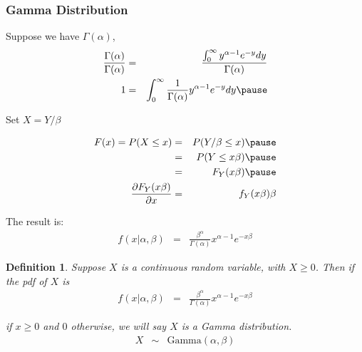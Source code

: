 \documentclass[handout]{beamer}
\newtheorem{defn}{Definition}
\numberwithin{equation}{section}
\begin{document}
\begin{frame}
\frametitle{Gamma Distribution}

Suppose we have $\Gamma(\alpha)$,  \pause 
\begin{eqnarray}
\frac{\Gamma(\alpha)}{\Gamma(\alpha)} & = & \frac{\int_{0}^{\infty} y^{\alpha-1} e^{-y} dy}{\Gamma(\alpha)} \nonumber \\
1 & = & \int_{0}^{\infty} \frac{1}{\Gamma(\alpha)} y^{\alpha-1} e^{-y} dy \nonumber  \pause 
\end{eqnarray}

Set $X = Y/\beta$ \pause 

\begin{eqnarray}
F(x) = P(X \leq x) & = & P(Y/\beta \leq x ) \nonumber \pause\\
& = & P(Y \leq x \beta ) \nonumber \pause\\
 & = & F_{Y} (x \beta) \nonumber \pause\\
\frac{\partial F_{Y} (x \beta) }{\partial x} & = & f_{Y} (x \beta) \beta \nonumber 
\end{eqnarray}

The result is: \pause 
 \begin{eqnarray}
f(x|\alpha, \beta) & = & \frac{\beta^{\alpha}}{\Gamma(\alpha)} x^{\alpha - 1} e^{-x\beta}  \nonumber 
 \end{eqnarray}



\end{frame}


\begin{frame}

\begin{defn}
Suppose $X$ is a continuous random variable, with $X \geq 0$.  Then if the pdf of $X$ is 
 \begin{eqnarray}
f(x|\alpha, \beta) & = & \frac{\beta^{\alpha}}{\Gamma(\alpha)} x^{\alpha - 1} e^{-x\beta}  \nonumber 
 \end{eqnarray}

if $x\geq 0$ and $0$ otherwise, we will say $X$ is a Gamma distribution. 
\begin{eqnarray}
X & \sim & \text{Gamma}(\alpha, \beta) \nonumber 
\end{eqnarray}

\end{defn}


\end{frame}
\end{document}
